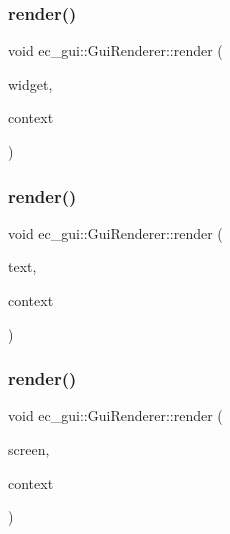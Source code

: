 \subsubsection{\texorpdfstring{render()}{render()}\hspace{0.1cm}{\footnotesize\ttfamily [2/5]}}
{\footnotesize\ttfamily void ec\+\_\+gui\+::\+Gui\+Renderer\+::render (\begin{DoxyParamCaption}\item[{\mbox{\hyperlink{classec__gui_1_1_widget}{Widget}} $\ast$}]{widget,  }\item[{\mbox{\hyperlink{classec__gui_1_1_gui_rendering_context}{Gui\+Rendering\+Context}} \&}]{context }\end{DoxyParamCaption})}

\mbox{\label{classec__gui_1_1_gui_renderer_a3484329593908c38ce2953e9632ebce7}} 
\subsubsection{\texorpdfstring{render()}{render()}\hspace{0.1cm}{\footnotesize\ttfamily [3/5]}}
{\footnotesize\ttfamily void ec\+\_\+gui\+::\+Gui\+Renderer\+::render (\begin{DoxyParamCaption}\item[{\mbox{\hyperlink{classec__gui_1_1_text}{Text}} $\ast$}]{text,  }\item[{\mbox{\hyperlink{classec__gui_1_1_gui_rendering_context}{Gui\+Rendering\+Context}} \&}]{context }\end{DoxyParamCaption})}

\mbox{\label{classec__gui_1_1_gui_renderer_ad33e6cb6537a95bcf9c2f2a575913e4d}} 
\subsubsection{\texorpdfstring{render()}{render()}\hspace{0.1cm}{\footnotesize\ttfamily [4/5]}}
{\footnotesize\ttfamily void ec\+\_\+gui\+::\+Gui\+Renderer\+::render (\begin{DoxyParamCaption}\item[{\mbox{\hyperlink{classec__gui_1_1_screen}{Screen}} $\ast$}]{screen,  }\item[{\mbox{\hyperlink{classec__gui_1_1_gui_rendering_context}{Gui\+Rendering\+Context}} \&}]{context }\end{DoxyParamCaption})}

